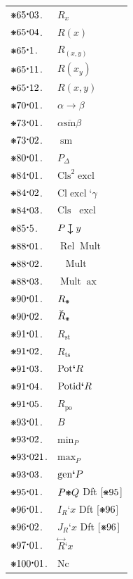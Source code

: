 \documentclass[12pt,openany,leqno,twocolumn]{book}
\newcommand{\pmast}{\text{\resizebox{!}{.75\height}{\ding{107}}}} %
\newcommand{\pmcdot}{\text{\raisebox{.05cm}{$\boldsymbol\cdot$}}} %
\newcommand{\pmbreve}[1]{\mathbf{\breve{\text{$#1$}}}}
\newcommand{\pmcrel}[1]{\pmbreve{#1}} %
\newcommand{\pmrtdri}[2]{#1_{#2}} %
\newcommand{\pmrtdrc}[2]{#1(#2)} %
\newcommand{\pmrdc}[2]{#1\boldsymbol{\to}#2} %
\newcommand{\pmsmbar}{\mathrel{\overline{\text{sm}}}} %
\newcommand{\pmsm}{\mathrel{\text{sm}}} %
\newcommand{\pmSelp}{P_{\Delta}}
\newcommand{\pmexc}{\text{Cls}^2 \mathop{\text{excl}}} %
\newcommand{\pmexcc}[1]{\text{Cl} \mathop{\text{excl}}\textbf{`}#1} %
\newcommand{\pmexcn}{\text{Cls} \mathop{\text{ex}^2} \mathop{\text{excl}}} %
\newcommand{\pmselc}[2]{#1 \mathrel{\ooalign{\rotatebox[origin=c]{270}{$\boldsymbol{\mapsto}$}}} #2}
\newcommand{\pmmultr}{\mathop{\text{Rel}} \mathop{\text{Mult}}} %
\newcommand{\pmmultc}{\mathop{\text{Cls}^2} \mathop{\text{Mult}}} %
\newcommand{\pmmultax}{\mathop{\text{Mult}} \mathop{\text{ax}}} %
\newcommand{\pmanc}[1]{#1_\pmast} %
\newcommand{\pmancc}[1]{\pmcrel{#1}_\pmast} %
\newcommand{\pmrst}[1]{#1_\text{st}} %
\newcommand{\pmrts}[1]{#1_\text{ts}} %
\newcommand{\pmpot}[1]{\text{Pot}\boldsymbol{`}#1} %
\newcommand{\pmpotid}[1]{\text{Potid}\boldsymbol{`}#1} %
\newcommand{\pmpo}[1]{#1_\text{po}} %
\newcommand{\pmB}{B} %
\newcommand{\pmmin}[1]{\text{min}_{#1}} %
\newcommand{\pmmax}[1]{\text{max}_{#1}} %
\newcommand{\pmgen}[1]{\text{gen}\boldsymbol{`}#1} %
\newcommand{\pmefr}[2]{#1\pmast#2} %
\newcommand{\pmipr}[2]{I_{#1}\textbf{`}#2} %
\newcommand{\pmjpr}[2]{J_{#1}\textbf{`}#2} %
\newcommand{\pmfr}[2]{\overset{\boldsymbol{\leftrightarrow}}{#1}\textbf{`}#2} %
\newcommand{\pmNc}{\text{Nc}}
\begin{document}
\begin{tabular}{l l}
$\pmast65\pmcdot03$. & $\pmrtdri{R}{x}$ \\
$\pmast65\pmcdot04$. & $\pmrtdrc{R}{x}$ \\
$\pmast65\pmcdot1$. & $\pmrtdri{R}{(x,y)}$ \\
$\pmast65\pmcdot11$. & $\pmrtdrc{R}{x_y}$\\
$\pmast65\pmcdot12$. & $\pmrtdrc{R}{x, y}$ \\
$\pmast70\pmcdot01$. & $\pmrdc{\alpha}{\beta}$ \\
$\pmast73\pmcdot01$. & $\alpha \pmsmbar \beta$ \\
$\pmast73\pmcdot02$. & $\pmsm$\\
$\pmast80\pmcdot01$. & $\pmSelp$ \\
$\pmast84\pmcdot01$. & $\pmexc$ \\
$\pmast84\pmcdot02$. & $\pmexcc{\gamma}$ \\
$\pmast84\pmcdot03$. & $\pmexcn$\\
$\pmast85\pmcdot5$. & $\pmselc{P}{\,y}$ \\
$\pmast88\pmcdot01$. & $\pmmultr$ \\
$\pmast88\pmcdot02$. & $\pmmultc$ \\
$\pmast88\pmcdot03$. & $\pmmultax$ \\
$\pmast90\pmcdot01$. & $\pmanc{R}$ \\
$\pmast90\pmcdot02$. & $\pmancc{R}$ \\
$\pmast91\pmcdot01$. & $\pmrst{R}$ \\
$\pmast91\pmcdot02$. & $\pmrts{R}$ \\
$\pmast91\pmcdot03$. & $\pmpot{R}$ \\
$\pmast91\pmcdot04$. & $\pmpotid{R}$ \\
$\pmast91\pmcdot05$. & $\pmpo{R}$ \\
$\pmast93\pmcdot01$. & $\pmB$ \\
$\pmast93\pmcdot02$. & $\pmmin{P}$ \\
$\pmast93\pmcdot021$. & $\pmmax{P}$ \\
$\pmast93\pmcdot03$. & $\pmgen{P}$ \\
$\pmast95\pmcdot01$. & $\pmefr{P}{Q}$ \hspace{.3cm} Dft [$\pmast95$] \\
$\pmast96\pmcdot01$. & $\pmipr{R}{x}$ \hspace{.415cm} Dft [$\pmast96$] \\
$\pmast96\pmcdot02$. & $\pmjpr{R}{x}$ \hspace{.375cm} Dft [$\pmast96$] \\
$\pmast97\pmcdot01$. & $\pmfr{R}{x}$ \\
$\pmast100\pmcdot01$. & $\pmNc$ 
\end{tabular}
\end{document}

